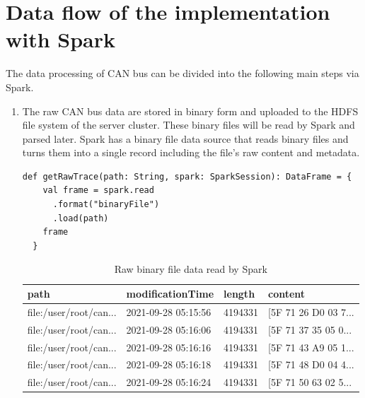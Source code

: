 \section{Data flow of the implementation with Spark}
The data processing of CAN bus can be divided into the following main steps via Spark.
\begin{enumerate}
\item The raw CAN bus data are stored in binary form and uploaded to the HDFS file system of the server cluster. These binary files will be read by Spark and parsed later. Spark has a binary file data source that reads binary files and turns them into a single record including the file's raw content and metadata\cite{binary_file_data_spark}.

\renewcommand{\lstlistingname}{Code} %
\begin{lstlisting}[caption=Spark: Reading binary files, style=myScalastyle, label=lst:Reading binary files]
  def getRawTrace(path: String, spark: SparkSession): DataFrame = {
    val frame = spark.read
      .format("binaryFile")
      .load(path)
    frame
  }
\end{lstlisting}


\begin{table}[hbt!]
\centering
\begin{tabular}{|l|l|l|l|}
\hline
\textbf{path}          & \textbf{modificationTime} & \textbf{length} & content                \\ \hline
file:/user/root/can... & 2021-09-28 05:15:56       & 4194331         & {[}5F 71 26 D0 03 7... \\ \hline
file:/user/root/can... & 2021-09-28 05:16:06       & 4194331         & {[}5F 71 37 35 05 0... \\ \hline
file:/user/root/can... & 2021-09-28 05:16:16       & 4194331         & {[}5F 71 43 A9 05 1... \\ \hline
file:/user/root/can... & 2021-09-28 05:16:18       & 4194331         & {[}5F 71 48 D0 04 4... \\ \hline
file:/user/root/can... & 2021-09-28 05:16:24       & 4194331         & {[}5F 71 50 63 02 5... \\ \hline
\end{tabular}%
\caption{Raw binary file data read by Spark}
\label{tab:raw_spark}
\end{table}


\end{enumerate}

